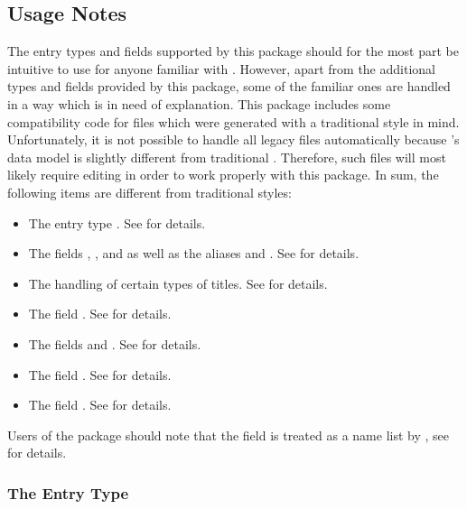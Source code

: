 \documentclass{ltxdockit}[2011/03/25]
\newcommand*{\biblatex}{\sty{biblatex}\xspace}
\begin{document}
\subsection{Usage Notes}
\label{bib:use}

The entry types and fields supported by this package should for the most part be intuitive to use for anyone familiar with \bibtex. However, apart from the additional types and fields provided by this package, some of the familiar ones are handled in a way which is in need of explanation.
This package includes some compatibility code for  files which were generated with a traditional \bibtex style in mind. Unfortunately, it is not possible to handle all legacy files automatically because \biblatex's data model is slightly different from traditional \bibtex. Therefore, such  files will most likely require editing in order to work properly with this package. In sum, the following items are different from traditional \bibtex styles:

\begin{itemize}
\setlength{\itemsep}{0pt}
\item The entry type . See  for details.
\item The fields , , and  as well as the aliases  and . See  for details.
\item The handling of certain types of titles. See  for details.
\item The field . See  for details.
\item The fields  and . See  for details.
\item The field . See  for details.
\item The field . See  for details.
\end{itemize}

Users of the  package should note that the  field is treated as a name list by \biblatex, see  for details.

\subsubsection{The Entry Type }
\label{bib:use:inb}
\end{document}
